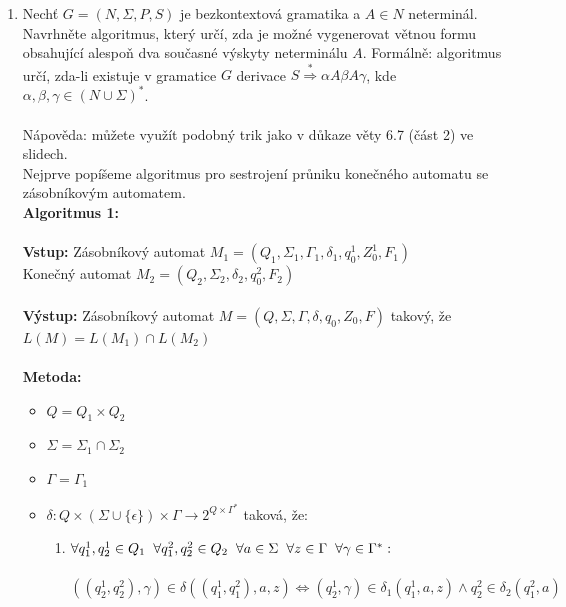\documentclass[a4paper,11pt]{article}[24.3.2010]
\begin{document}
\begin{enumerate}
\begin{enumerate}
\end{enumerate}

\newpage

\item Nechť $G=(N,\Sigma,P,S)$ je bezkontextová gramatika a $A \in N$ neterminál. Navrhněte algoritmus, který určí, zda je možné vygenerovat větnou formu obsahující alespoň dva současné výskyty neterminálu $A$. Formálně: algoritmus určí, zda-li existuje v gramatice $G$ derivace $S \overset{*}{\Rightarrow} \alpha A \beta A \gamma$, kde $\alpha,\beta,\gamma \in (N \cup \Sigma)^*$.\\\\
Nápověda: můžete využít podobný trik jako v důkaze věty 6.7 (část 2) ve slidech.\\

Nejprve popíšeme algoritmus pro sestrojení průniku konečného automatu se zásobníkovým automatem.\\

{\bf Algoritmus 1:}\\\\
{\bf Vstup:} Zásobníkový automat $M_{1}=(Q_{1},\Sigma_{1},\Gamma_{1},\delta_{1},q_{0}^1,Z_{0}^1,F_{1})$\\
\phantom{Vstup: } Konečný automat $M_{2}=(Q_{2},\Sigma_{2},\delta_{2},q_{0}^2,F_{2})$\\\\
{\bf Výstup:} Zásobníkový automat $M=(Q,\Sigma,\Gamma,\delta,q_{0},Z_{0},F)$ takový, že $L(M)=L(M_{1}) \cap L(M_{2})$\\\\
{\bf Metoda:}
\begin{itemize}
\item $Q=Q_{1} \times Q_{2}$\\
\item $\Sigma=\Sigma_{1} \cap \Sigma_{2}$\\
\item $\Gamma = \Gamma_{1}$\\
\item $\delta : Q \times (\Sigma \cup \{\epsilon\}) \times \Gamma \rightarrow 2^{Q \times \Gamma^*}$ taková, že:\\
\begin{enumerate}
\item $\forall q_{1}^1,q_{2}^1 \in Q_{1} \hspace{2mm} \forall q_{1}^2,q_{2}^2 \in Q_{2} \hspace{2mm} \forall a \in \Sigma \hspace{2mm} \forall z \in \Gamma \hspace{2mm} \forall \gamma \in \Gamma^*:$\\\\
$((q_{2}^1,q_{2}^2),\gamma) \in \delta((q_{1}^1,q_{1}^2),a,z) \Leftrightarrow (q_{2}^1,\gamma) \in \delta_{1}(q_{1}^1,a,z) \wedge q_{2}^2 \in \delta_{2}(q_{1}^2,a)$\\


\end{enumerate}
\end{itemize}
\end{enumerate}
\end{document}
